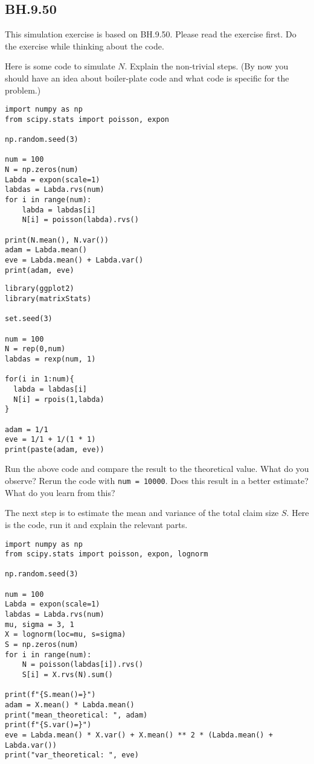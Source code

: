 

\subsection{BH.9.50}

This simulation exercise is based on BH.9.50. Please read the exercise first. Do the exercise while thinking about the code.

\begin{exercise}
Here is some code to simulate $N$.  Explain the non-trivial steps. (By now you should have an idea about boiler-plate code and what code is specific for the problem.)

\begin{verbatim}
import numpy as np
from scipy.stats import poisson, expon

np.random.seed(3)

num = 100
N = np.zeros(num)
Labda = expon(scale=1)
labdas = Labda.rvs(num)
for i in range(num):
    labda = labdas[i]
    N[i] = poisson(labda).rvs()

print(N.mean(), N.var())
adam = Labda.mean()
eve = Labda.mean() + Labda.var()
print(adam, eve)
\end{verbatim}

\begin{verbatim}
library(ggplot2)
library(matrixStats)

set.seed(3)

num = 100
N = rep(0,num)
labdas = rexp(num, 1) 

for(i in 1:num){
  labda = labdas[i]
  N[i] = rpois(1,labda)
}

adam = 1/1
eve = 1/1 + 1/(1 * 1)
print(paste(adam, eve))
\end{verbatim}

\end{exercise}

\begin{exercise}
Run the above code and compare the result to the theoretical value. What do you observe? Rerun the code with \texttt{num = 10000}. Does this result in a better estimate? What do you learn from this?
\end{exercise}

\begin{exercise}
The next step is to estimate the mean and variance of the total claim size $S$.
Here is the code, run it and explain the relevant parts.
\begin{verbatim}
import numpy as np
from scipy.stats import poisson, expon, lognorm

np.random.seed(3)

num = 100
Labda = expon(scale=1)
labdas = Labda.rvs(num)
mu, sigma = 3, 1
X = lognorm(loc=mu, s=sigma)
S = np.zeros(num)
for i in range(num):
    N = poisson(labdas[i]).rvs()
    S[i] = X.rvs(N).sum()

print(f"{S.mean()=}")
adam = X.mean() * Labda.mean()
print("mean_theoretical: ", adam)
print(f"{S.var()=}")
eve = Labda.mean() * X.var() + X.mean() ** 2 * (Labda.mean() + Labda.var())
print("var_theoretical: ", eve)
\end{verbatim}
\end{exercise}


